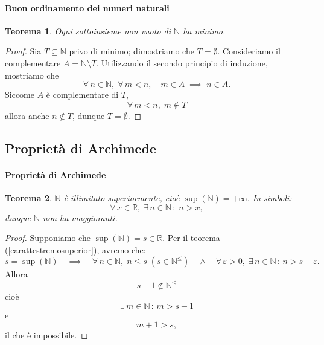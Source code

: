 \documentclass{article}
\theoremstyle{plain}
\newtheorem{thm}{Teorema}[section]
\theoremstyle{definition}
\theoremstyle{remark}
\begin{document}
\vspace{10pt}

\paragraph{Buon ordinamento dei numeri naturali}
\begin{bxthm}
\begin{thm}\label{buonord}
    Ogni sottoinsieme non vuoto di $\mathbb{N}$ ha minimo.
\end{thm}
\end{bxthm}
\begin{proof}
    Sia $T\subseteq\mathbb{N}$ privo di minimo; dimostriamo che $T=\emptyset$.
    Consideriamo il complementare $A=\mathbb{N}\setminus T$.
    Utilizzando il secondo principio di induzione, mostriamo che 
    \[\forall\, n\in\mathbb{N},\;\forall\, m<n,\quad m\in A \;\implies\; n\in A.\]
    Siccome $A$ è complementare di $T$, 
    \[\forall\, m<n,\;m\notin T\] allora anche $n\notin T$, dunque $T=\emptyset$.
\end{proof}

\vspace{10pt}

\subsection{Proprietà di Archimede}

\vspace{10pt}

\paragraph{Proprietà di Archimede}
\begin{bxthm}
\begin{thm}
    $\mathbb{N}$ è illimitato superiormente, cioè $\sup(\mathbb{N})=+\infty$.
    In simboli:
    \[\forall\, x\in\mathbb{R},\;\exists\, n\in\mathbb{N}\,:\;n>x,\] dunque $\mathbb{N}$ non ha maggioranti.
\end{thm}
\end{bxthm}
\begin{proof}
    Supponiamo che $\sup(\mathbb{N})=s\in\mathbb{R}$.
    Per il teorema (\ref{carattestremosuperior}), avremo che:
    \[s=\sup(\mathbb{N})\quad\implies\quad \forall\,n\in \mathbb{N},\; n\leq s\;(s\in\mathbb{N}^\leq)\quad\land\quad\forall\,\varepsilon>0,\;\exists\, n\in\mathbb{N}\,:\,n>s-\varepsilon.\]
    Allora \[s-1\notin \mathbb{N}^\leq\] cioè \[\exists\, m\in\mathbb{N}\,:\,m>s-1\] e \[m+1>s,\] il che è impossibile.
\end{proof}
\end{document}
